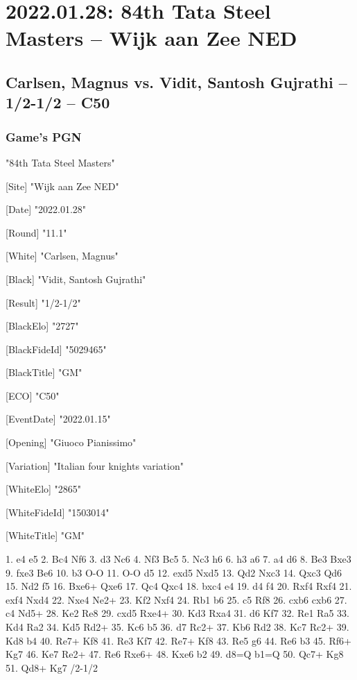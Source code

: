 \documentclass[9pt]{extarticle}
\begin{document}
\section*{2022.01.28: 84th Tata Steel Masters -- Wijk aan Zee NED}

\subsection*{Carlsen, Magnus vs. Vidit, Santosh Gujrathi -- 1/2-1/2 -- C50}
\subsubsection*{Game's PGN}
\begin{flushleft}
[Event] "84th Tata Steel Masters"

[Site] "Wijk aan Zee NED"

[Date] "2022.01.28"

[Round] "11.1"

[White] "Carlsen, Magnus"

[Black] "Vidit, Santosh Gujrathi"

[Result] "1/2-1/2"

[BlackElo] "2727"

[BlackFideId] "5029465"

[BlackTitle] "GM"

[ECO] "C50"

[EventDate] "2022.01.15"

[Opening] "Giuoco Pianissimo"

[Variation] "Italian four knights variation"

[WhiteElo] "2865"

[WhiteFideId] "1503014"

[WhiteTitle] "GM"

\end{flushleft}
\begin{flushleft}
1. e4 e5 2. Bc4 Nf6 3. d3 Nc6 4. Nf3 Bc5 5. Nc3 h6 6. h3 a6 7. a4 d6 8. Be3 Bxe3 9. fxe3 Be6 10. b3 O-O 11. O-O d5 12. exd5 Nxd5 13. Qd2 Nxc3 14. Qxc3 Qd6 15. Nd2 f5 16. Bxe6+ Qxe6 17. Qc4 Qxc4 18. bxc4 e4 19. d4 f4 20. Rxf4 Rxf4 21. exf4 Nxd4 22. Nxe4 Ne2+ 23. Kf2 Nxf4 24. Rb1 b6 25. c5 Rf8 26. cxb6 cxb6 27. c4 Nd5+ 28. Ke2 Re8 29. cxd5 Rxe4+ 30. Kd3 Rxa4 31. d6 Kf7 32. Re1 Ra5 33. Kd4 Ra2 34. Kd5 Rd2+ 35. Kc6 b5 36. d7 Rc2+ 37. Kb6 Rd2 38. Kc7 Rc2+ 39. Kd8 b4 40. Re7+ Kf8 41. Re3 Kf7 42. Re7+ Kf8 43. Re5 g6 44. Re6 b3 45. Rf6+ Kg7 46. Ke7 Re2+ 47. Re6 Rxe6+ 48. Kxe6 b2 49. d8=Q b1=Q 50. Qc7+ Kg8 51. Qd8+ Kg7 \quad  {}/2-1/2
\end{flushleft}
\end{document}
